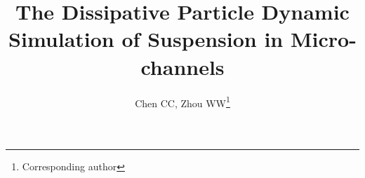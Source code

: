 \documentclass[12pt]{article}
\begin{document}
\title{The Dissipative Particle Dynamic Simulation of Suspension in Micro-channels}
\author{Chen CC, Zhou WW\footnote{Corresponding author}}
\maketitle










\end{document}
